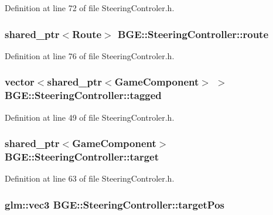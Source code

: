 Definition at line 72 of file Steering\-Controler.\-h.

\hypertarget{class_b_g_e_1_1_steering_controller_a17816a6268bc4055a01c5c90eb505320}{
\subsubsection[{route}]{\setlength{\rightskip}{0pt plus 5cm}shared\-\_\-ptr$<${\bf Route}$>$ B\-G\-E\-::\-Steering\-Controller\-::route}}\label{class_b_g_e_1_1_steering_controller_a17816a6268bc4055a01c5c90eb505320}


Definition at line 76 of file Steering\-Controler.\-h.

\hypertarget{class_b_g_e_1_1_steering_controller_a0bef7f9e4477fa9be8f9679b21aef252}{
\subsubsection[{tagged}]{\setlength{\rightskip}{0pt plus 5cm}vector$<$shared\-\_\-ptr$<${\bf Game\-Component}$>$ $>$ B\-G\-E\-::\-Steering\-Controller\-::tagged}}\label{class_b_g_e_1_1_steering_controller_a0bef7f9e4477fa9be8f9679b21aef252}


Definition at line 49 of file Steering\-Controler.\-h.

\hypertarget{class_b_g_e_1_1_steering_controller_aa692367fc05dd499a1cc55995147a76a}{
\subsubsection[{target}]{\setlength{\rightskip}{0pt plus 5cm}shared\-\_\-ptr$<${\bf Game\-Component}$>$ B\-G\-E\-::\-Steering\-Controller\-::target}}\label{class_b_g_e_1_1_steering_controller_aa692367fc05dd499a1cc55995147a76a}


Definition at line 63 of file Steering\-Controler.\-h.

\hypertarget{class_b_g_e_1_1_steering_controller_a0484eb39c0aaf8b38caf6e2aa836fc05}{
\subsubsection[{target\-Pos}]{\setlength{\rightskip}{0pt plus 5cm}glm\-::vec3 B\-G\-E\-::\-Steering\-Controller\-::target\-Pos}}\label{class_b_g_e_1_1_steering_controller_a0484eb39c0aaf8b38caf6e2aa836fc05}


